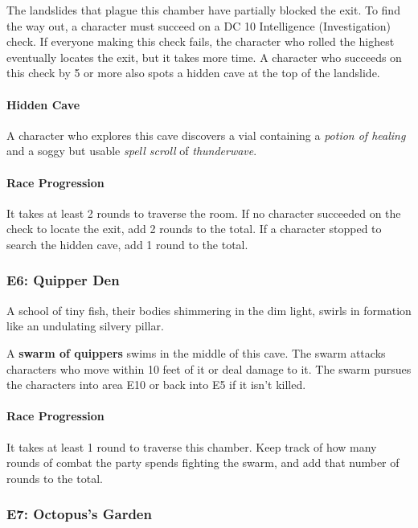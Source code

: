 \documentclass[letterpaper, 11pt, bg=full, twocolumn]{dndbook}
\begin{document}
The landslides that plague this chamber have partially blocked the exit. To find the way out, a character must succeed on a DC 10 Intelligence (Investigation) check. If everyone making this check fails, the character who rolled the highest eventually locates the exit, but it takes more time. A character who succeeds on this check by 5 or more also spots a hidden cave at the top of the landslide.

\paragraph{Hidden Cave}

A character who explores this cave discovers a vial containing a \textit{potion of healing} and a soggy but usable \textit{spell scroll} of \textit{thunderwave}.

\paragraph{Race Progression}

It takes at least 2 rounds to traverse the room. If no character succeeded on the check to locate the exit, add 2 rounds to the total. If a character stopped to search the hidden cave, add 1 round to the total.

\subsubsection{E6: Quipper Den}

\begin{DndReadAloud}
A school of tiny fish, their bodies shimmering in the dim light, swirls in formation like an undulating silvery pillar.
\end{DndReadAloud}

A \textbf{swarm of quippers} swims in the middle of this cave. The swarm attacks characters who move within 10 feet of it or deal damage to it. The swarm pursues the characters into area E10 or back into E5 if it isn't killed.

\paragraph{Race Progression}

It takes at least 1 round to traverse this chamber. Keep track of how many rounds of combat the party spends fighting the swarm, and add that number of rounds to the total.

\subsubsection{E7: Octopus's Garden}
\end{document}
